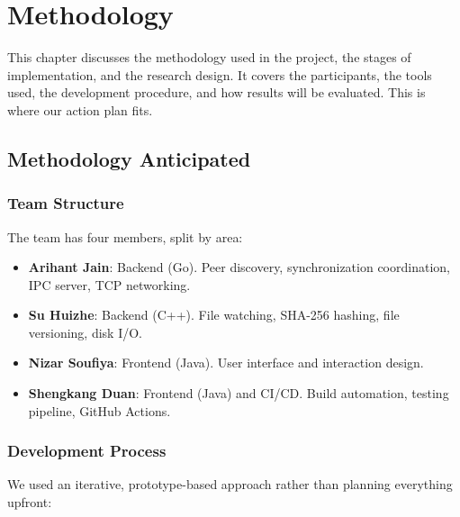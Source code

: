 \chapter{Methodology}

This chapter discusses the methodology used in the project, the stages of implementation, and the research design. It covers the participants, the tools used, the development procedure, and how results will be evaluated. This is where our action plan fits.

\section{Methodology Anticipated}
\label{sec:method-anticipated}

\subsection{Team Structure}

The team has four members, split by area:

\begin{itemize}
    \item \textbf{Arihant Jain}: Backend (Go). Peer discovery, synchronization coordination, IPC server, TCP networking.
    \item \textbf{Su Huizhe}: Backend (C++). File watching, SHA-256 hashing, file versioning, disk I/O.
    \item \textbf{Nizar Soufiya}: Frontend (Java). User interface and interaction design.
    \item \textbf{Shengkang Duan}: Frontend (Java) and CI/CD. Build automation, testing pipeline, GitHub Actions.
\end{itemize}

\subsection{Development Process}

We used an iterative, prototype-based approach rather than planning everything upfront:

